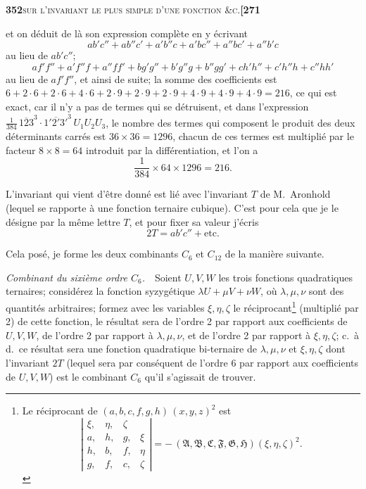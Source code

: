 \documentclass[11pt]{article}
\begin{document}
\newpage
\setcounter{page}{352}

\noindent\textbf{352}\hfill\textsc{sur l'invariant le plus simple d'une fonction \&c.}\hfill\textbf{[271}

\medskip

\noindent et on d\'eduit de l\`a son expression compl\`ete en y \'ecrivant
\[
   a b' c'' + a b'' c' + a' b'' c + a' b c'' + a'' b c' + a'' b' c
\]
au lieu de $a b' c''$;
\[
   a f' f'' + a' f'' f + a'' f f' + b g' g'' + b' g'' g + b'' g g' + c h' h'' + c' h'' h + c'' h h'
\]
au lieu de $a f' f''$, et ainsi de suite; la somme des coefficients est $6 + 2\cdot 6 + 2\cdot 6 + 4\cdot 6 + 2\cdot 9 + 2\cdot 9 + 2\cdot 9 + 4\cdot 9 + 4\cdot 9 + 4\cdot 9 = 216$, ce qui est exact, car il n'y a pas de termes qui se d\'etruisent, et dans l'expression $\tfrac{1}{384}\,\overline{123}^3\cdot\overline{1'2'3'}^3\,U_1 U_2 U_3$, le nombre des termes qui composent le produit des deux d\'eterminants carr\'es est $36\times 36 = 1296$, chacun de ces termes est multipli\'e par le facteur $8\times 8 = 64$ introduit par la diff\'erentiation, et l'on a
\[
   \frac{1}{384}\times 64\times 1296 = 216.
\]

\medskip

\noindent L'invariant qui vient d'\^etre donn\'e est li\'e avec l'invariant $T$ de M.~Aronhold (lequel se rapporte \`a une fonction ternaire cubique). C'est pour cela que je le d\'esigne par la m\^eme lettre $T$, et pour fixer sa valeur j'\'ecris
\[
   2 T = a b' c'' + \text{etc.}
\]

\medskip

\noindent Cela pos\'e, je forme les deux combinants $C_6$ et $C_{12}$ de la mani\`ere suivante.

\medskip

\noindent\textit{Combinant du sixi\`eme ordre $C_6$.}\ \ Soient $U, V, W$ les trois fonctions quadratiques ternaires; consid\'erez la fonction syzyg\'etique $\lambda U + \mu V + \nu W$, o\`u $\lambda, \mu, \nu$ sont des quantit\'es arbitraires; formez avec les variables $\xi, \eta, \zeta$ le r\'eciprocant\footnote{Le r\'eciprocant de $(a, b, c, f, g, h)\,(x, y, z)^2$ est
\[
   \left|\begin{array}{cccc} \xi, & \eta, & \zeta\\ a, & h, & g, & \xi\\ h, & b, & f, & \eta\\ g, & f, & c, & \zeta\end{array}\right| = -\,(\mathfrak{A},\mathfrak{B},\mathfrak{C},\mathfrak{F},\mathfrak{G},\mathfrak{H})(\xi, \eta, \zeta)^2.
\]
} (multipli\'e par 2) de cette fonction, le r\'esultat sera de l'ordre 2 par rapport aux coefficients de $U, V, W$, de l'ordre 2 par rapport \`a $\lambda, \mu, \nu$, et de l'ordre 2 par rapport \`a $\xi, \eta, \zeta$; c.\ \`a d.\ ce r\'esultat sera une fonction quadratique bi-ternaire de $\lambda, \mu, \nu$ et $\xi, \eta, \zeta$ dont l'invariant $2 T$ (lequel sera par cons\'equent de l'ordre 6 par rapport aux coefficients de $U, V, W$) est le combinant $C_6$ qu'il s'agissait de trouver.
\end{document}
